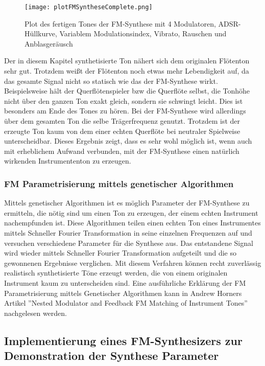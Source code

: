 \begin{figure} [h!t!b!]
\centering
  \texttt{[image: plotFMSyntheseComplete.png]}
\caption{Plot des fertigen Tones der FM-Synthese mit 4 Modulatoren, ADSR-Hüllkurve, Variablem Modulationsindex, Vibrato, Rauschen und Anblasgeräusch}
\label{fig:plotFMSyntheseComplete}
\end{figure}

Der in diesem Kapitel synthetisierte Ton nähert sich dem originalen Flötenton sehr gut. Trotzdem weißt der Flötenton noch etwas mehr Lebendigkeit auf, da das gesamte Signal nicht so statisch wie das der FM-Synthese wirkt. Beispielsweise hält der Querflötenspieler bzw die Querflöte selbst, die Tonhöhe nicht über den ganzen Ton exakt gleich, sondern sie schwingt leicht. Dies ist besonders am Ende des Tones zu hören. Bei der FM-Synthese wird allerdings über dem gesamten Ton die selbe Trägerfrequenz genutzt. Trotzdem ist der erzeugte Ton kaum von dem einer echten Querflöte bei neutraler Spielweise unterscheidbar. Dieses Ergebnis zeigt, dass es sehr wohl möglich ist, wenn auch mit erheblichem Aufwand verbunden, mit der FM-Synthese einen natürlich wirkenden Instrumententon zu erzeugen. 


\FloatBarrier
\subsubsection{FM Parametrisierung mittels genetischer Algorithmen}

Mittels genetischer Algorithmen ist es möglich Parameter der FM-Synthese zu ermitteln, die nötig sind um einen Ton zu erzeugen, der einem echten Instrument nachempfunden ist. Diese Algorithmen teilen einen echten Ton eines Instrumentes mittels Schneller Fourier Transformation in seine einzelnen Frequenzen auf und versuchen verschiedene Parameter für die Synthese aus. Das entstandene Signal wird wieder mittels Schneller Fourier Transformation aufgeteilt und die so gewonnenen Ergebnisse verglichen. Mit diesem Verfahren können recht zuverlässig realistisch synthetisierte Töne erzeugt werden, die von einem originalen Instrument kaum zu unterscheiden sind. Eine ausführliche Erklärung der FM Parametrisierung mittels Genetischer Algorithmen kann in Andrew Horners Artikel ''Nested Modulator and Feedback FM Matching of Instrument Tones'' nachgelesen werden.

\FloatBarrier
\subsection{Implementierung eines FM-Synthesizers zur Demonstration der Synthese Parameter}

